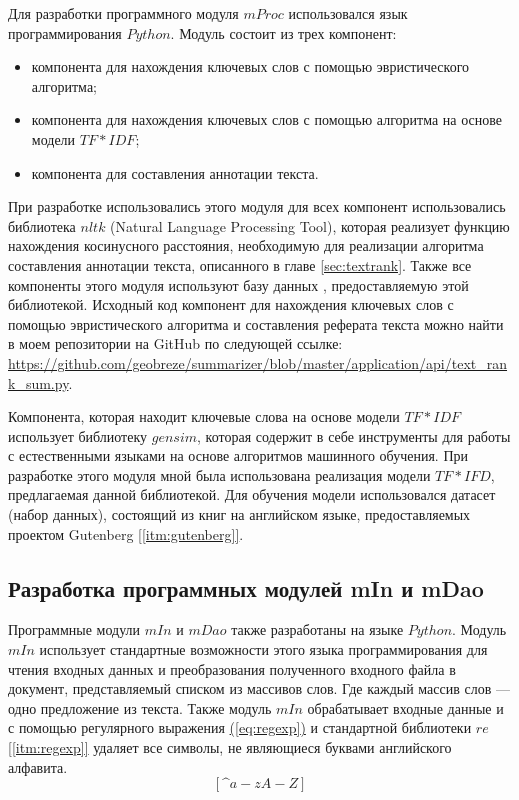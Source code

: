 Для разработки программного модуля $mProc$ использовался язык программирования $Python$. Модуль состоит из трех компонент:
\begin{itemize}
\item компонента для нахождения ключевых слов с помощью эвристического алгоритма;
\item компонента для нахождения ключевых слов с помощью алгоритма на основе модели $TF*IDF$;
\item компонента для составления аннотации текста.
\end{itemize}

При разработке использовались этого модуля для всех компонент использовались библиотека $nltk$ (Natural Language Processing Tool), которая реализует функцию нахождения косинусного расстояния, необходимую для реализации алгоритма составления аннотации текста, описанного в главе \hyperref[sec:textrank]{\ref{sec:textrank}}. Также все компоненты этого модуля используют базу данных , предоставляемую этой библиотекой.
Исходный код компонент для нахождения ключевых слов с помощью эвристического алгоритма и составления реферата текста можно найти в моем репозитории на GitHub по следующей ссылке: \url{https://github.com/geobreze/summarizer/blob/master/application/api/text_rank_sum.py}.

Компонента, которая находит ключевые слова на основе модели $TF*IDF$ использует библиотеку $gensim$, которая содержит в себе инструменты для работы с естественными языками на основе алгоритмов машинного обучения. При разработке этого модуля мной была использована реализация модели $TF*IFD$, предлагаемая данной библиотекой. Для обучения модели использовался датасет (набор данных), состоящий из книг на английском языке, предоставляемых проектом Gutenberg \hyperref[itm:gutenberg]{[\ref{itm:gutenberg}]}.

\subsection{Разработка программных модулей mIn и mDao}

Программные модули $mIn$ и $mDao$ также разработаны на языке $Python$. Модуль $mIn$ использует стандартные возможности этого языка программирования для чтения входных данных и преобразования полученного входного файла в документ, представляемый списком из массивов слов. Где каждый массив слов --- одно предложение из текста. Также модуль $mIn$ обрабатывает входные данные и с помощью регулярного выражения \hyperref[eq:regexp]{(\ref{eq:regexp})} и стандартной библиотеки $re$ \hyperref[itm:regexp]{[\ref{itm:regexp}]} удаляет все символы, не являющиеся буквами английского алфавита.
\begin{equation}
\label{eq:regexp}
[\text{\textasciicircum}a-zA-Z]
\end{equation}


